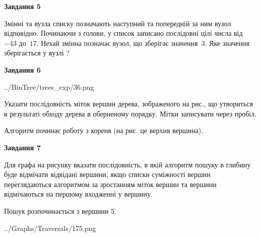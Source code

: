 \documentclass[12pt, ukrainian]{article}
\begin{document}
{\begin {large}
{\begin {center}\textbf{Завдання 5}\end {center}}\par
Змінні  та  вузла списку позначають наступний та попередній за ним вузол відповідно. Починаючи з голови, у список записано послідовні цілі числа від~$-43$ до~$17$. Нехай змінна  позначає вузол, що зберігає значення~$3$.
Яке значення зберігається у вузлі  ?\par
\newpage

{\begin {center}\textbf{Завдання 6}\end {center}}\par

\begin{center}
	{../BinTree/trees_exp/36.png}
\end{center}
Указати послідовність міток вершин дерева, зображеного на рис., що утвориться в результаті обходу дерева в оберненому порядку. Мітки записувати через пробіл.\par Алгоритм починає роботу з кореня (на рис. це верхня вершина).\par
\newpage

{\begin {center}\textbf{Завдання 7}\end {center}}\par
Для графа на рисунку вказати послідовність, в якій алгоритм пошуку в глибину буде відмічати відвідані вершини, якщо списки суміжності вершин переглядаються алгоритмом за зростанням міток вершин та вершини відмічаються на першому вход\-женні у вершину.\par
Пошук розпочинається з вершини 5.\par

\begin{center}
	{../Graphs/Traversals/175.png}
\end{center}\par
\newpage


\end{large}}
\end{document}
